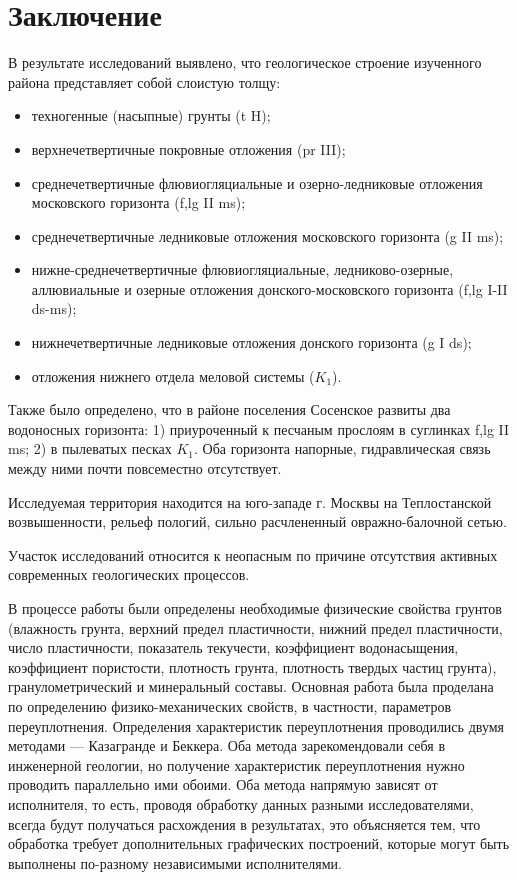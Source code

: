 \chapter{Заключение}\label{ch:ch8}

В результате исследований выявлено, что геологическое строение 
изученного района представляет собой слоистую толщу:

\begin{itemize}
    \item техногенные (насыпные) грунты (t H);
    \item верхнечетвертичные покровные отложения (pr III);
    \item среднечетвертичные флювиогляциальные и озерно-ледниковые отложения московского горизонта (f,lg II ms);
    \item среднечетвертичные ледниковые отложения московского горизонта (g II ms);
    \item нижне-среднечетвертичные флювиогляциальные, ледниково-озерные, аллювиальные и озерные отложения донского-московского горизонта (f,lg I-II ds-ms);
    \item нижнечетвертичные ледниковые отложения донского горизонта (g I ds);
    \item отложения нижнего отдела меловой системы ($K_1$).
\end{itemize}

Также было определено, что в районе поселения Сосенское развиты два водоносных горизонта: 
1) приуроченный к песчаным прослоям в суглинках f,lg II ms; 2) в пылеватых песках $K_1$. 
Оба горизонта напорные, гидравлическая связь между ними почти повсеместно отсутствует.

Исследуемая территория находится на юго-западе г. Москвы на
Теплостанской возвышенности, рельеф пологий, сильно расчлененный 
овражно-балочной сетью.

Участок исследований относится к неопасным по причине отсутствия активных современных 
геологических процессов.

В процессе работы были определены необходимые физические свойства
грунтов (влажность грунта, верхний предел пластичности, 
нижний предел пластичности, число пластичности, 
показатель текучести, коэффициент водонасыщения, 
коэффициент пористости, плотность грунта, 
плотность твердых частиц грунта), гранулометрический и 
минеральный составы. Основная работа была проделана по 
определению физико-механических свойств, 
в частности, параметров переуплотнения. Определения 
характеристик переуплотнения проводились 
двумя методами --- Казагранде и Беккера. 
Оба метода зарекомендовали себя в инженерной 
геологии, но получение характеристик переуплотнения 
нужно проводить параллельно ими обоими. Оба метода 
напрямую зависят от исполнителя, то есть, проводя 
обработку данных разными исследователями, всегда 
будут получаться расхождения в результатах, это 
объясняется тем, что обработка требует дополнительных 
графических построений, которые могут быть 
выполнены по-разному независимыми исполнителями.

